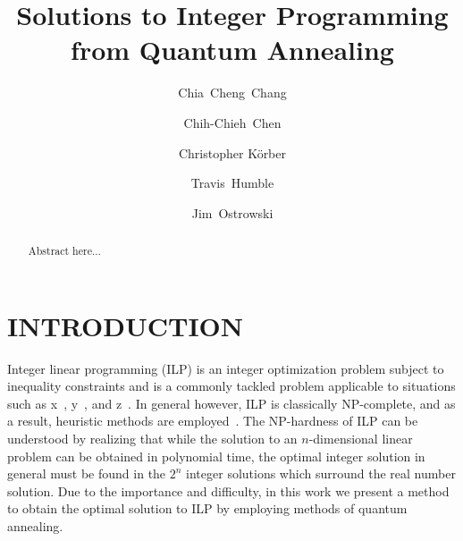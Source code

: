\documentclass[prd,twocolumn,tightenlines,preprintnumbers,showpacs,superscriptaddress,notitlepage,nofootinbib,eqsecnum,floatfix,longbibliography]{revtex4}
\begin{document}
\title{Solutions to Integer Programming from Quantum Annealing}

\author{Chia~Cheng~Chang}
\author{Chih-Chieh~Chen}
\author{Christopher K\"orber}
\author{Travis~Humble}
\author{Jim~Ostrowski}

\begin{abstract}
Abstract here...
\end{abstract}


\maketitle

\flushbottom
\maketitle

\section{INTRODUCTION}
\label{sec:introduction}

Integer linear programming (ILP) is an integer optimization problem subject to inequality constraints and is a commonly tackled problem applicable to situations such as x~\cite{}, y~\cite{}, and z~\cite{}. In general however, ILP is classically NP-complete, and as a result, heuristic methods are employed~\cite{}. The NP-hardness of ILP can be understood by realizing that while the solution to an $n$-dimensional linear problem can be obtained in polynomial time, the optimal integer solution in general must be found in the $2^n$ integer solutions which surround the real number solution. Due to the importance and difficulty, in this work we present a method to obtain the optimal solution to ILP by employing methods of quantum annealing.
\end{document}
